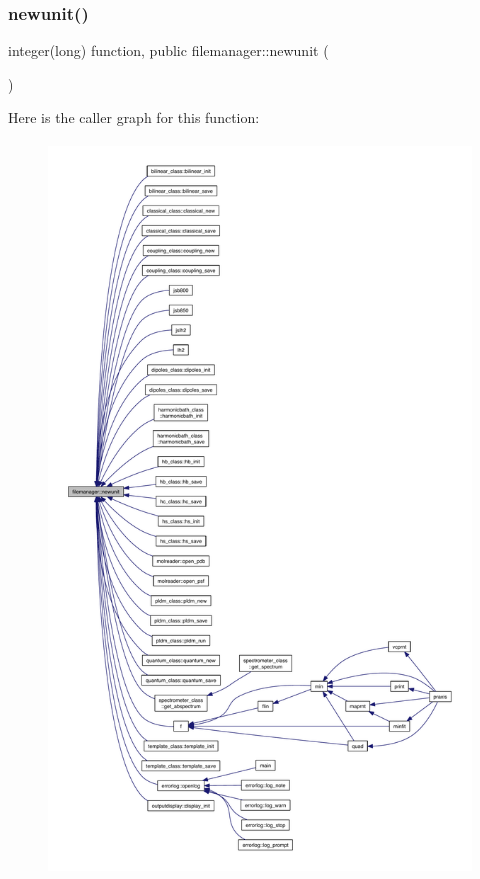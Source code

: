 \subsubsection{\texorpdfstring{newunit()}{newunit()}}
{\footnotesize\ttfamily integer(long) function, public filemanager\+::newunit (\begin{DoxyParamCaption}{ }\end{DoxyParamCaption})}

Here is the caller graph for this function\+:\nopagebreak
\begin{figure}[H]
\begin{center}
\leavevmode
\includegraphics[height=550pt]{namespacefilemanager_aa389048ef7c9eb9afdac7ce1dcc691b2_icgraph}
\end{center}
\end{figure}
